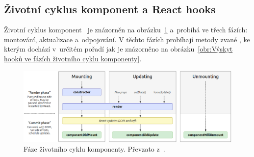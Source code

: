 \subsection*{Životní cyklus komponent a React hooks}
\label{sec:Životní cyklus komponent a React hooks}
Životní cyklus komponent~\cite{article:BeginnersGuideToReact} je znázorněn na obrázku~\ref{obr:Fáze životního cyklu komponenty} a~probíhá ve třech fázích: montování, aktualizace a~odpojování. V těchto fázích probíhají metody zvané , ke kterým dochází v~určitém pořadí jak je znázorněno na obrázku~\ref{obr:Výskyt hooků ve fázích životního cyklu komponenty}.
\begin{figure}[hbt]
	\centering
	\setlength{\fboxsep}{0pt}
	\includegraphics[width=1\textwidth]{obrazky-figures/faze_komponenty.png}
	\caption{Fáze životního cyklu komponenty. Převzato z~\cite{article:BeginnersGuideToReact}.}
	\label{obr:Fáze životního cyklu komponenty}
\end{figure}

